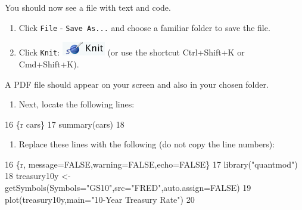 \documentclass[
]{book}
\newenvironment{Shaded}{\begin{snugshade}}{\end{snugshade}}
\newcommand{\AttributeTok}[1]{\textcolor[rgb]{0.13,0.29,0.53}{#1}}
\newcommand{\DecValTok}[1]{\textcolor[rgb]{0.00,0.00,0.81}{#1}}
\newcommand{\StringTok}[1]{\textcolor[rgb]{0.31,0.60,0.02}{#1}}
\providecommand{\tightlist}{%
  \setlength{\itemsep}{0pt}\setlength{\parskip}{0pt}}
\begin{document}
You should now see a file with text and code.

\begin{enumerate}
\def\labelenumi{\arabic{enumi}.}
\setcounter{enumi}{13}
\tightlist
\item
  Click \texttt{File} - \texttt{Save\ As...} and choose a familiar folder to save the file.
\item
  Click \texttt{Knit}: \includegraphics{files/icons-rstudio/knit.png} (or use the shortcut Ctrl+Shift+K or Cmd+Shift+K).
\end{enumerate}

A PDF file should appear on your screen and also in your chosen folder.

\begin{enumerate}
\def\labelenumi{\arabic{enumi}.}
\setcounter{enumi}{15}
\tightlist
\item
  Next, locate the following lines:
\end{enumerate}

\begin{Shaded}
\begin{Highlighting}[]
\DecValTok{16} \StringTok{\textasciigrave{}\textasciigrave{}\textasciigrave{}}\AttributeTok{\{r cars\}}
\AttributeTok{17 summary(cars)}
\AttributeTok{18 }\StringTok{\textasciigrave{}\textasciigrave{}\textasciigrave{}}
\end{Highlighting}
\end{Shaded}

\begin{enumerate}
\def\labelenumi{\arabic{enumi}.}
\setcounter{enumi}{16}
\tightlist
\item
  Replace these lines with the following (do not copy the line numbers):
\end{enumerate}

\begin{Shaded}
\begin{Highlighting}[]
\DecValTok{16} \StringTok{\textasciigrave{}\textasciigrave{}\textasciigrave{}}\AttributeTok{\{r, message=FALSE,warning=FALSE,echo=FALSE\}}
\AttributeTok{17 library("quantmod")}
\AttributeTok{18 treasury10y \textless{}{-} getSymbols(Symbols="GS10",src="FRED",auto.assign=FALSE)}
\AttributeTok{19 plot(treasury10y,main="10{-}Year Treasury Rate")}
\AttributeTok{20 }\StringTok{\textasciigrave{}\textasciigrave{}\textasciigrave{}}
\end{Highlighting}
\end{Shaded}
\end{document}
